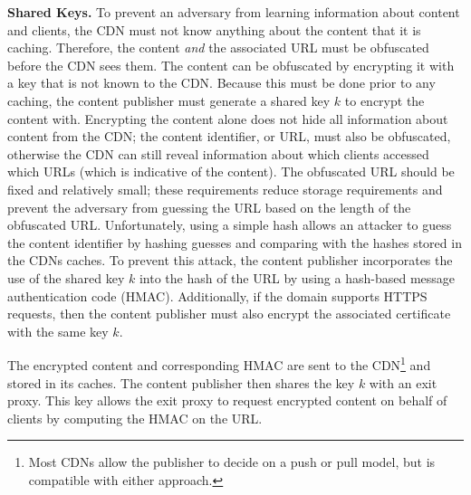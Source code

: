 \textbf{Shared Keys.} 
To prevent an adversary from learning information about content and clients, the CDN must not know anything
about the
content that it is caching.  Therefore, the content {\it and} the associated URL
must be obfuscated
before the CDN sees them.  The content can be obfuscated by encrypting it with a
key that is not
known to the CDN.  Because this must be done prior to any caching, the content publisher must 
generate a shared key $k$ to encrypt the content with. Encrypting the content alone does not 
hide all information about content from the CDN; the content identifier, or URL, must also be obfuscated, otherwise the 
CDN can still reveal information about which clients accessed which URLs (which is indicative 
of the content).  The obfuscated URL should be fixed and relatively
small; 
these requirements reduce storage requirements and prevent the adversary from guessing
the
URL based on the length of the obfuscated URL.  Unfortunately, using a simple hash allows an 
attacker to guess the content identifier by hashing guesses and comparing with 
the hashes stored in the CDNs caches.  To prevent this attack, the content publisher incorporates the use 
of the shared key $k$ into the hash of the URL by using a hash-based message authentication code 
(HMAC).  Additionally, if the domain supports HTTPS requests, then the content publisher must 
also encrypt the associated certificate with the same key $k$.

The encrypted content and corresponding HMAC are sent to the CDN\footnote{Most CDNs
allow the publisher to
decide on a push or pull model, but \system{} is compatible with either approach.}
and stored in
its caches.  The content publisher then shares the key $k$ with an exit proxy. 
This key allows the 
exit proxy to request encrypted content on behalf of clients by computing the HMAC on the URL.  

